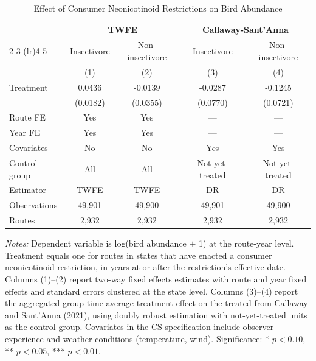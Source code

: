 \begin{table}[t]
\centering
\caption{Effect of Consumer Neonicotinoid Restrictions on Bird Abundance}
\label{tab:main}
\begin{tabular}{lcccc}
\toprule
 & \multicolumn{2}{c}{TWFE} & \multicolumn{2}{c}{Callaway-Sant'Anna} \\
\cmidrule(lr){2-3} \cmidrule(lr){4-5}
 & Insectivore & Non-insectivore & Insectivore & Non-insectivore \\
 & (1) & (2) & (3) & (4) \\
\midrule
Treatment & 0.0436 & -0.0139 & -0.0287 & -0.1245 \\
 & (0.0182) & (0.0355) & (0.0770) & (0.0721) \\
\midrule
Route FE & Yes & Yes & --- & --- \\
Year FE & Yes & Yes & --- & --- \\
Covariates & No & No & Yes & Yes \\
Control group & All & All & Not-yet-treated & Not-yet-treated \\
Estimator & TWFE & TWFE & DR & DR \\
Observations & 49,901 & 49,900 & 49,901 & 49,900 \\
Routes & 2,932 & 2,932 & 2,932 & 2,932 \\
\bottomrule
\end{tabular}
\begin{tablenotes}[flushleft]
\item \textit{Notes:} Dependent variable is log(bird abundance $+$ 1) at the route-year level. Treatment equals one for routes in states that have enacted a consumer neonicotinoid restriction, in years at or after the restriction's effective date. Columns (1)--(2) report two-way fixed effects estimates with route and year fixed effects and standard errors clustered at the state level. Columns (3)--(4) report the aggregated group-time average treatment effect on the treated from Callaway and Sant'Anna (2021), using doubly robust estimation with not-yet-treated units as the control group. Covariates in the CS specification include observer experience and weather conditions (temperature, wind). Significance: * $p < 0.10$, ** $p < 0.05$, *** $p < 0.01$.
\end{tablenotes}
\end{table}
